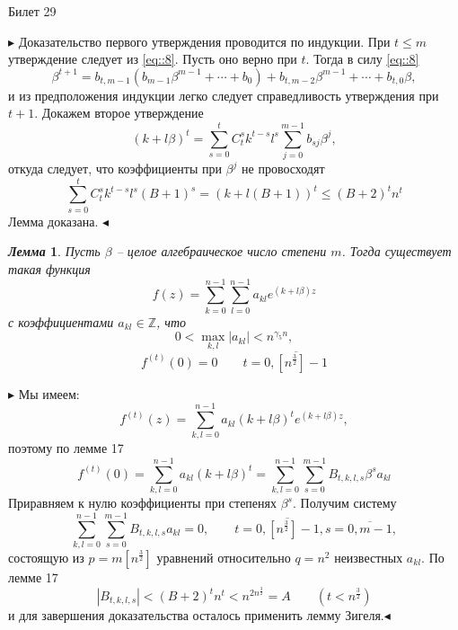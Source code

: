 \documentclass[a4paper,12pt]{article}
\newtheorem{lem}{\textit{Лемма}}
\newcommand{\q}{\quad}
\newcommand{\pb}{\blacktriangleright}
\newcommand{\pe}{\blacktriangleleft}
\newcommand{\bb}[1]{\mathbb{#1}}
\newcommand{\SL}{\sum\limits}
\begin{document}
\newpage
\begin{mybox}{{Билет 29}}

$\pb$ Доказательство первого утверждения проводится по индукции. При $t \le m$ утверждение следует из \ref{eq::8}. Пусть оно верно при $t$. Тогда в силу \ref{eq::8} \[\beta^{t+1} = b_{t,m-1}(b_{m-1}\beta^{m-1} + \cdots + b_0) + b_{t,m-2}\beta^{m-1} + \cdots + b_{t,0}\beta,\]
и из предположения индукции легко следует справедливость утверждения при $t + 1$.
Докажем второе утверждение\[ (k+l\beta)^t = \SL_{s=0}^t C_t^s k^{t-s}l^s \SL_{j=0}^{m-1}b_{sj}\beta^j,   \]
откуда следует, что коэффициенты при $\beta^j$ не провосходят \[\SL_{s=0}^t C_t^sk^{t-s}l^s (B+1)^s = (k+l(B+1))^t \le (B+2)^tn^t \]
Лемма доказана. $\pe$
\begin{formbox}{}
\begin{lem} Пусть $\beta$ -- целое алгебраическое число степени $m$. Тогда существует такая функция \[f(z) = \SL_{k=0}^{n-1}\SL_{l=0}^{n-1} a_{kl}e^{(k+l\beta)z} \]
с коэффициентами $a_{kl}\in\bb{Z}$, что \[0 < \max\limits_{k,l}|a_{kl}|< n^{\gamma_5n},\] \[f^{(t)}(0) = 0\q\q t = \overline{0, [n^\frac{3}{2}]-1} \]
\end{lem}
\end{formbox}
$\pb$
Мы имеем:
\begin{equation}
f^{(t)}(z) = \SL_{k,l=0}^{n-1}a_{kl}(k + l\beta)^te^{(k+l\beta)z},\label{eq::9}
\end{equation} 
поэтому по лемме 17 \[f^{(t)}(0) = \SL_{k,l=0}^{n-1}a_{kl}(k + l\beta)^t =\SL_{k,l=0}^{n-1}\SL_{s=0}^{m-1} B_{t,k,l,s}\beta^sa_{kl}\]
Приравняем к нулю коэффициенты при степенях $\beta^s$. Получим систему
\[ \SL_{k,l=0}^{n-1}\SL_{s=0}^{m-1} B_{t,k,l,s}a_{kl} = 0,\q\q t = \overline{0, [n^\frac{3}{2}] - 1}, s = \overline{ 0, m - 1},\]
состоящую из \(p = m[n^\frac{3}{2}]\) уравнений относительно \(q = n^2\) неизвестных $a_{kl}$. По лемме 17
\[|B_{t,k,l,s}| < (B + 2)^tn^t < n^{2n^\frac{3}{2}} = A \q\q (t < n^\frac{3}{2})\]
и для завершения доказательства осталось применить лемму Зигеля.$\pe$
\end{mybox}
\end{document}
